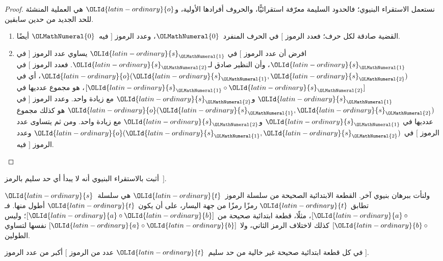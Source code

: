 \documentclass[../../../include/open-logic-section]{subfiles}
\begin{document}
\begin{proof}
نستعمل الاستقراء البنيوي؛ فالحدود السليمة معرّفة استقرائيًّا، والحروف
أفرادها الأولية، و$\OLId{latin-ordinary}{o}$ هي العملية المنشئة للحد الجديد من حدين سابقين.
\begin{enumerate}
\item القضية صادقة لكل حرف؛ فعدد الرموز $[$ في الحرف المنفرد~$\OLMathNumeral{0}$،
  وعدد الرموز $]$ فيه~$\OLMathNumeral{0}$ أيضًا.
\item افرض أن عدد الرموز $[$ في $\OLId{latin-ordinary}{s}_\OLMathNumeral{1}$ يساوي عدد الرموز $]$ في
  $\OLId{latin-ordinary}{s}_\OLMathNumeral{1}$، وأن النظير صادق لـ$\OLId{latin-ordinary}{s}_\OLMathNumeral{2}$. فعدد الرموز $[$ في
  $\OLId{latin-ordinary}{o}(\OLId{latin-ordinary}{s}_\OLMathNumeral{1}, \OLId{latin-ordinary}{s}_\OLMathNumeral{2})$، أي في $[\OLId{latin-ordinary}{s}_\OLMathNumeral{1} \circ \OLId{latin-ordinary}{s}_\OLMathNumeral{2}]$، هو مجموع عدديها في
  $\OLId{latin-ordinary}{s}_\OLMathNumeral{1}$ و$\OLId{latin-ordinary}{s}_\OLMathNumeral{2}$ مع زيادة واحد. وعدد الرموز $]$ في
  $\OLId{latin-ordinary}{o}(\OLId{latin-ordinary}{s}_\OLMathNumeral{1}, \OLId{latin-ordinary}{s}_\OLMathNumeral{2})$ هو كذلك مجموع عدديها في $\OLId{latin-ordinary}{s}_\OLMathNumeral{1}$ و$\OLId{latin-ordinary}{s}_\OLMathNumeral{2}$ مع زيادة
  واحد. ومن ثم يتساوى عدد الرموز $[$ في $\OLId{latin-ordinary}{o}(\OLId{latin-ordinary}{s}_\OLMathNumeral{1}, \OLId{latin-ordinary}{s}_\OLMathNumeral{2})$ وعدد الرموز
  $]$ فيه.
\end{enumerate}
\end{proof}

\begin{prob}
  أثبت بالاستقراء البنيوي أنه لا يبدأ أي حد سليم بالرمز~$]$.
\end{prob}

ولنأت ببرهان بنيوي آخر. القطعة الابتدائية الصحيحة من سلسلة الرموز~$\OLId{latin-ordinary}{t}$
هي سلسلة~$\OLId{latin-ordinary}{s}$ تطابق $\OLId{latin-ordinary}{t}$ رمزًا رمزًا من جهة اليسار، على أن يكون $\OLId{latin-ordinary}{t}$
أطول منها. فـ$[\OLId{latin-ordinary}{a} \circ {}$، مثلًا، قطعة ابتدائية صحيحة من
$[\OLId{latin-ordinary}{a} \circ \OLId{latin-ordinary}{b}]$؛ وليس $[\OLId{latin-ordinary}{b} \circ {}$ كذلك لاختلاف الرمز الثاني، ولا
$[\OLId{latin-ordinary}{a} \circ \OLId{latin-ordinary}{b}]$ نفسها لتساوي الطولين.

\begin{prop}
  في كل قطعة ابتدائية صحيحة غير خالية من حد سليم~$\OLId{latin-ordinary}{t}$ عدد من الرموز $[$ أكبر من
  عدد الرموز $]$.
\end{prop}
\end{document}
